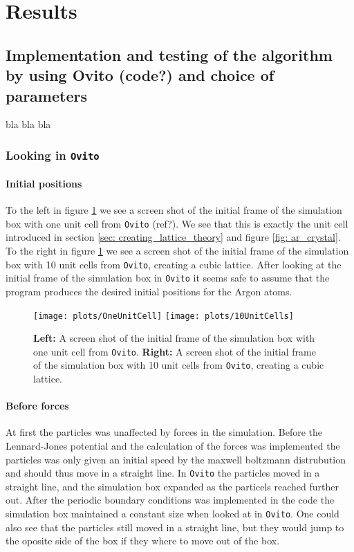 \documentclass[11pt,a4wide]{article}
\begin{document}
\section{Results} %

\subsection{Implementation and testing of the algorithm by using Ovito (code?) and choice of parameters}
bla bla bla

\subsubsection*{Looking in \texttt{Ovito}}
\paragraph{Initial positions}
To the left in figure \ref{fig: unitCellsOvito} we see a screen shot of the initial frame of the simulation box with one unit cell from \texttt{Ovito} (ref?). We see that this is exactly the unit cell introduced in section \ref{sec: creating_lattice_theory} and figure \ref{fig: ar_crystal}. To the right in figure \ref{fig: unitCellsOvito} we see a screen shot of the initial frame of the simulation box with 10 unit cells from \texttt{Ovito}, creating a cubic lattice. After looking at the initial frame of the simulation box in \texttt{Ovito} it seems safe to assume that the program produces the desired initial positions for the Argon atoms. 

\begin{figure}[htp]
\centering
\texttt{[image: plots/OneUnitCell]}
\texttt{[image: plots/10UnitCells]}
\caption{\textbf{Left:} A screen shot of the initial frame of the simulation box with one unit cell from \texttt{Ovito}. \textbf{Right:} A screen shot of the initial frame of the simulation box with 10 unit cells from \texttt{Ovito}, creating a cubic lattice.}
\label{fig: unitCellsOvito}
\end{figure}

\paragraph{Before forces}
At first the particles was unaffected by forces in the simulation. Before the Lennard-Jones potential and the calculation of the forces was implemented the particles was only given an initial speed by the maxwell boltzmann distrubution and should thus move in a straight line. In \texttt{Ovito} the particles moved in a straight line, and the simulation box expanded as the particels reached further out. After the periodic boundary conditions was implemented in the code the simulation box maintained a constant size when looked at in \texttt{Ovito}. One could also see that the particles still moved in a straight line, but they would jump to the oposite side of the box if they where to move out of the box. 
\end{document}
